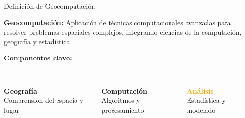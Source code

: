 \documentclass[10pt]{beamer}
\begin{document}
\begin{frame}{Definición de Geocomputación}
    \begin{tcolorbox}[colframe=usachblue,colback=blue!5]
        \textbf{Geocomputación:} Aplicación de técnicas computacionales avanzadas para resolver problemas espaciales complejos, integrando ciencias de la computación, geografía y estadística.
    \end{tcolorbox}
    
    \vspace{0.5cm}
    
    \textbf{Componentes clave:}
    \begin{columns}
        \begin{center}
            \textcolor{usachblue}{ \\ \textbf{Geografía}}\\
            Comprensión del espacio y lugar
        \end{center}
        
        \begin{center}
            \textcolor{usachred}{ \\ \textbf{Computación}}\\
            Algoritmos y procesamiento
        \end{center}
        
        \begin{center}
            \textcolor{orange}{ \\ \textbf{Análisis}}\\
            Estadística y modelado
        \end{center}
    \end{columns}
\end{frame}
\end{document}
